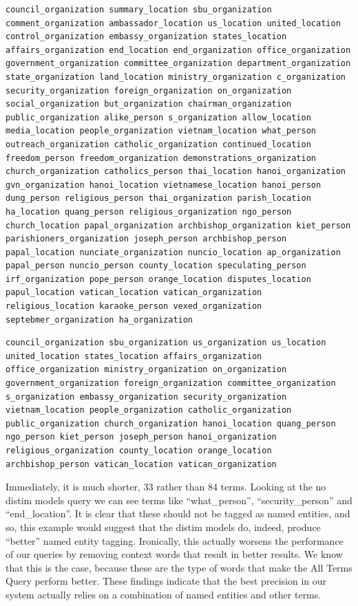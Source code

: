 \documentclass{l4proj}
\begin{document}
\begin{verbatim}
council_organization summary_location sbu_organization comment_organization ambassador_location us_location united_location control_organization embassy_organization states_location affairs_organization end_location end_organization office_organization government_organization committee_organization department_organization state_organization land_location ministry_organization c_organization security_organization foreign_organization on_organization social_organization but_organization chairman_organization public_organization alike_person s_organization allow_location media_location people_organization vietnam_location what_person outreach_organization catholic_organization continued_location freedom_person freedom_organization demonstrations_organization church_organization catholics_person thai_location hanoi_organization gvn_organization hanoi_location vietnamese_location hanoi_person dung_person religious_person thai_organization parish_location ha_location quang_person religious_organization ngo_person church_location papal_organization archbishop_organization kiet_person parishioners_organization joseph_person archbishop_person papal_location nunciate_organization nuncio_location ap_organization papal_person nuncio_person county_location speculating_person irf_organization pope_person orange_location disputes_location papul_location vatican_location vatican_organization religious_location karaoke_person vexed_organization septebmer_organization ha_organization
\end{verbatim}
\begin{verbatim}
council_organization sbu_organization us_organization us_location united_location states_location affairs_organization office_organization ministry_organization on_organization government_organization foreign_organization committee_organization s_organization embassy_organization security_organization vietnam_location people_organization catholic_organization public_organization church_organization hanoi_location quang_person ngo_person kiet_person joseph_person hanoi_organization religious_organization county_location orange_location archbishop_person vatican_location vatican_organization
\end{verbatim}
Immediately, it is much shorter, 33 rather than 84 terms.
Looking at the no distim models query we can see terms like ``what\_person'', ``security\_person'' and ``end\_location''. It is clear that these should not be tagged as named entities, and so, this example would suggest that the distim models do, indeed, produce ``better'' named entity tagging. Ironically, this actually worsens the performance of our queries by removing context words that result in better results. We know that this is the case, because these are the type of words that make the All Terms Query perform better.
These findings indicate that the best precision in our system actually relies on a combination of named entities and other terms.
\end{document}
